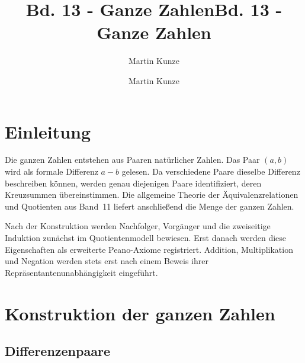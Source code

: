 \documentclass[main.tex]{subfiles}
\title{Bd. 13 - Ganze Zahlen}
\author{Martin Kunze}
\date{}
\begin{document}
\title{Bd. 13 - Ganze Zahlen}
\author{Martin Kunze}
\date{}
\hypersetup{pageanchor=false}
\maketitle
\hypersetup{pageanchor=true}
\setcounter{tocdepth}{3}
\tableofcontents
\setcounter{file}{13}
\renewcommand{\FormulaBandID}{13}

\chapter{Einleitung}

Die ganzen Zahlen entstehen aus Paaren natürlicher Zahlen. Das Paar
\((a,b)\) wird als formale Differenz \(a-b\) gelesen. Da verschiedene Paare
dieselbe Differenz beschreiben können, werden genau diejenigen Paare
identifiziert, deren Kreuzsummen übereinstimmen. Die allgemeine Theorie der
Äquivalenzrelationen und Quotienten aus Band~11 liefert anschließend die
Menge der ganzen Zahlen.

Nach der Konstruktion werden Nachfolger, Vorgänger und die zweiseitige
Induktion zunächst im Quotientenmodell bewiesen. Erst danach werden diese
Eigenschaften als erweiterte Peano-Axiome registriert. Addition,
Multiplikation und Negation werden stets erst nach einem Beweis ihrer
Repräsentantenunabhängigkeit eingeführt.

\chapter{Konstruktion der ganzen Zahlen}

\section{Differenzenpaare}



\begin{tabproof}
\end{tabproof}
\end{document}
